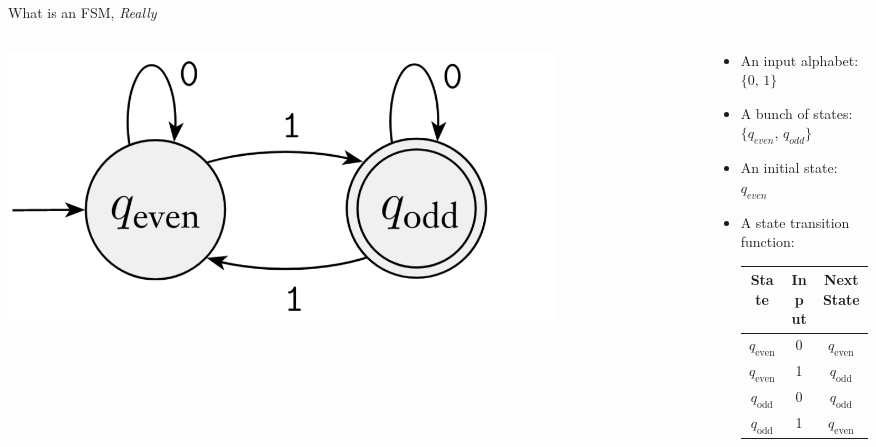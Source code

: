 \documentclass[aspectratio=169, 11pt, handout]{beamer}
\begin{document}
\begin{frame}{What is an FSM, \emph{Really}}
\begin{columns}


\begin{column}{0.5\textwidth}
    \begin{center}
        \includegraphics[width=0.8\textwidth]{oddDFA.png}
    \end{center}
\end{column}\pause
\begin{column}{0.5\textwidth}
    \begin{itemize}
        \item An input alphabet\pause :~$\{0,\,1\}$\pause
        \item A bunch of states\pause :~$\{q_{even},\,q_{odd} \}$\pause
        \item An initial state\pause :~$q_{even}$\pause
        \item A state transition function\pause :
        
\begin{center}
\begin{tabular}{cc|c}
\toprule
State & Input & Next State\\
\midrule
\(q_{\mathrm{even}}\) & 0 & \(q_{\mathrm{even}}\)\\
\(q_{\mathrm{even}}\) & 1 & \(q_{\mathrm{odd }}\)\\
\(q_{\mathrm{odd }}\) & 0 & \(q_{\mathrm{odd }}\)\\
\(q_{\mathrm{odd }}\) & 1 & \(q_{\mathrm{even}}\)\\
\bottomrule
\end{tabular}
\end{center}

    \end{itemize}
\end{column}
\end{columns}

\end{frame}
\end{document}
